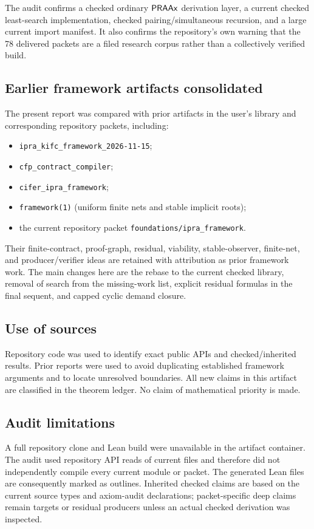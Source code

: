 The audit confirms a checked ordinary \(\mathsf{PRAAx}\) derivation layer, a current checked least-search implementation, checked pairing/simultaneous recursion, and a large current import manifest.  It also confirms the repository's own warning that the 78 delivered packets are a filed research corpus rather than a collectively verified build.

\subsection{Earlier framework artifacts consolidated}

The present report was compared with prior artifacts in the user's library and corresponding repository packets, including:
\begin{itemize}
  \item \texttt{ipra\_kifc\_framework\_2026-11-15};
  \item \texttt{cfp\_contract\_compiler};
  \item \texttt{cifer\_ipra\_framework};
  \item \texttt{framework(1)} (uniform finite nets and stable implicit roots);
  \item the current repository packet \texttt{foundations/ipra\_framework}.
\end{itemize}
Their finite-contract, proof-graph, residual, viability, stable-observer, finite-net, and producer/verifier ideas are retained with attribution as prior framework work.  The main changes here are the rebase to the current checked library, removal of search from the missing-work list, explicit residual formulas in the final sequent, and capped cyclic demand closure.

\subsection{Use of sources}

Repository code was used to identify exact public APIs and checked/inherited results.  Prior reports were used to avoid duplicating established framework arguments and to locate unresolved boundaries.  All new claims in this artifact are classified in the theorem ledger.  No claim of mathematical priority is made.

\subsection{Audit limitations}

A full repository clone and Lean build were unavailable in the artifact container.  The audit used repository API reads of current files and therefore did not independently compile every current module or packet.  The generated Lean files are consequently marked as outlines.  Inherited checked claims are based on the current source types and axiom-audit declarations; packet-specific deep claims remain targets or residual producers unless an actual checked derivation was inspected.

